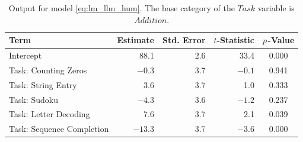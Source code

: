 \documentclass[12pt,a4paper]{article}
\begin{document}
\begin{table}[ht]
\caption{Output for model \eqref{eq:lm_llm_hum}. The base category of the $\mathit{Task}$ variable is $\mathit{Addition}$. }
\label{tab:lm_llm_hum}
\renewcommand{\arraystretch}{1.2}
\centering\small
\begin{tabular}{lrrrc}
  \toprule
\textbf{Term} & \textbf{Estimate} & \textbf{Std. Error} & \textbf{$t$-Statistic} & \textbf{$p\mspace{2mu}$-Value} \\ 
  \midrule
Intercept & 88.1 & 2.6 & 33.4 & 0.000 \\
Task: Counting Zeros & $-0.3$ & 3.7 & $-0.1$ & 0.941 \\
Task: String Entry & 3.6 & 3.7 & 1.0 & 0.333 \\
Task: Sudoku & $-4.3$ & 3.6 & $-1.2$ & 0.237 \\
Task: Letter Decoding & 7.6 & 3.7 & 2.1 & 0.039 \\
Task: Sequence Completion & $-13.3$ & 3.7 & $-3.6$ & 0.000 \\

\end{tabular}
\end{table}
\end{document}
